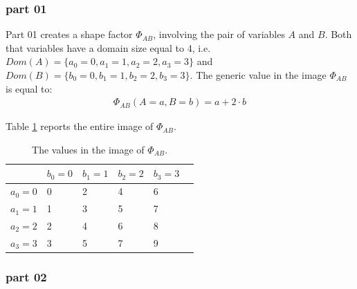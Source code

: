 \subsubsection{part 01}

Part 01 creates a shape factor $\Phi_{AB}$, involving the pair of variables $A$ and $B$. Both that variables have a domain size equal to 4, i.e. $Dom(A) = \lbrace a_0 = 0, a_1 =1 , a_2=2, a_3=3 \rbrace$ and  $Dom(B) = \lbrace b_0=0, b_1=1, b_2=2, b_3=3 \rbrace$.
The generic value in the image $\Phi_{AB}$ is equal to:
\begin{eqnarray}
 \Phi_{AB}(A = a, B= b) = a + 2 \cdot b
\end{eqnarray} 

Table \ref{tab:S_1:t1} reports the entire image of $\Phi_{AB}$.

\begin{table}[]
\centering
\begin{tabular}{l|l|l|l|l|l|}
      & $b_0 = 0$ & $b_1 = 1$ & $b_2 = 2$ & $b_3= 3$ \\
      \hline
$a_0 = 0$ & 0     & 2     & 4     & 6     \\
\hline
$a_1 = 1$ & 1     & 3     & 5     & 7     \\
\hline
$a_2 = 2$ & 2     & 4     & 6     & 8     \\
\hline 
$a_3 = 3$ & 3     & 5     & 7     & 9     \\
\hline 
\end{tabular}
\caption{The values in the image of $\Phi _{AB}$.} 
\label{tab:S_1:t1}
\end{table}

\subsubsection{part 02}
\label{samples:01:corr_anti}

